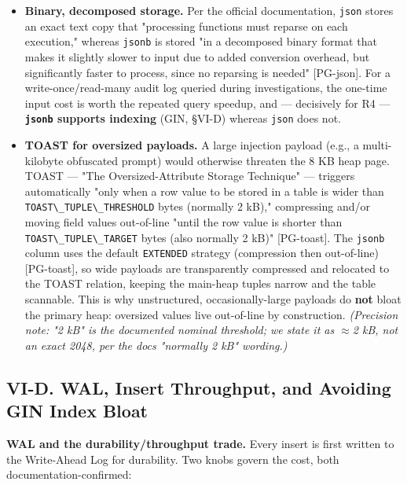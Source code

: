 \begin{itemize}
\tightlist
\item
  \textbf{Binary, decomposed storage.} Per the official documentation,
  \passthrough{\lstinline!json!} stores an exact text copy that
  "processing functions must reparse on each execution," whereas
  \passthrough{\lstinline!jsonb!} is stored "in a decomposed binary
  format that makes it slightly slower to input due to added conversion
  overhead, but significantly faster to process, since no reparsing is
  needed" {[}PG-json{]}. For a write-once/read-many audit log queried
  during investigations, the one-time input cost is worth the repeated
  query speedup, and --- decisively for R4 ---
  \textbf{\passthrough{\lstinline!jsonb!} supports indexing} (GIN,
  §VI-D) whereas \passthrough{\lstinline!json!} does not.
\item
  \textbf{TOAST for oversized payloads.} A large injection payload
  (e.g., a multi-kilobyte obfuscated prompt) would otherwise threaten
  the 8 KB heap page. TOAST --- "The Oversized-Attribute Storage
  Technique" --- triggers automatically "only when a row value to be
  stored in a table is wider than
  \passthrough{\lstinline!TOAST\_TUPLE\_THRESHOLD!} bytes (normally 2
  kB)," compressing and/or moving field values out-of-line "until the
  row value is shorter than
  \passthrough{\lstinline!TOAST\_TUPLE\_TARGET!} bytes (also normally 2
  kB)" {[}PG-toast{]}. The \passthrough{\lstinline!jsonb!} column uses
  the default \passthrough{\lstinline!EXTENDED!} strategy (compression
  then out-of-line) {[}PG-toast{]}, so wide payloads are transparently
  compressed and relocated to the TOAST relation, keeping the main-heap
  tuples narrow and the table scannable. This is why unstructured,
  occasionally-large payloads do \textbf{not} bloat the primary heap:
  oversized values live out-of-line by construction. \emph{(Precision
  note: "2 kB" is the documented nominal threshold; we state it as $\approx$2
  kB, not an exact 2048, per the docs\textquotesingle{} "normally 2 kB"
  wording.)}
\end{itemize}

\subsection{VI-D. WAL, Insert Throughput, and Avoiding GIN Index
Bloat}\label{vi-d-wal-insert-throughput-and-avoiding-gin-index-bloat}

\textbf{WAL and the durability/throughput trade.} Every insert is first
written to the Write-Ahead Log for durability. Two knobs govern the
cost, both documentation-confirmed:

